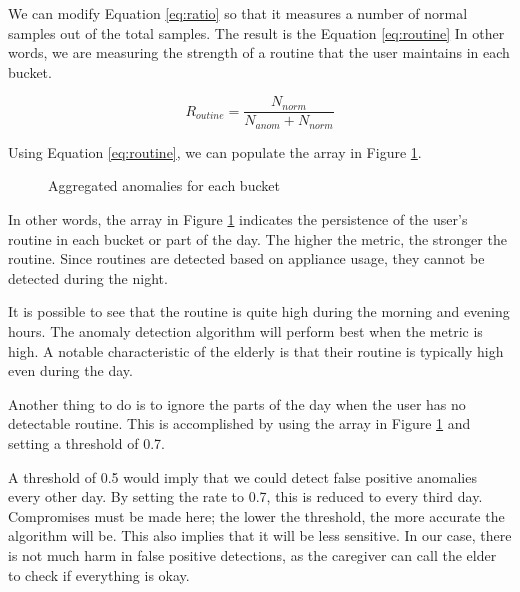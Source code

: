 We can modify Equation \ref{eq:ratio} so that it measures a number of normal samples out of the total samples. 
The result is the Equation \ref{eq:routine}
In other words, we are measuring the strength of a routine that the user maintains in each bucket.

\begin{equation}
    R_{outine}= \frac{N_{norm}}{N_{anom}+N_{norm}}
    \label{eq:routine}
\end{equation}

Using Equation \ref{eq:routine}, we can populate the array in Figure \ref{arr:anom_ratio}.

\begin{figure}[H]
    \centering
    \caption{Aggregated anomalies for each bucket}
    \label{arr:anom_ratio}
\end{figure}

In other words, the array in Figure \ref{arr:anom_ratio} indicates the persistence of the user's routine in each bucket or part of the day.
The higher the metric, the stronger the routine.
Since routines are detected based on appliance usage, they cannot be detected during the night.

It is possible to see that the routine is quite high during the morning and evening hours.
The anomaly detection algorithm will perform best when the metric is high.
A notable characteristic of the elderly is that their routine is typically high even during the day.

Another thing to do is to ignore the parts of the day when the user has no detectable routine.
This is accomplished by using the array in Figure \ref{arr:anom_ratio} and setting a threshold of 0.7.

A threshold of 0.5 would imply that we could detect false positive anomalies every other day.
By setting the rate to 0.7, this is reduced to every third day.
Compromises must be made here; the lower the threshold, the more accurate the algorithm will be.
This also implies that it will be less sensitive.
In our case, there is not much harm in false positive detections, as the caregiver can call the elder to check if everything is okay.

